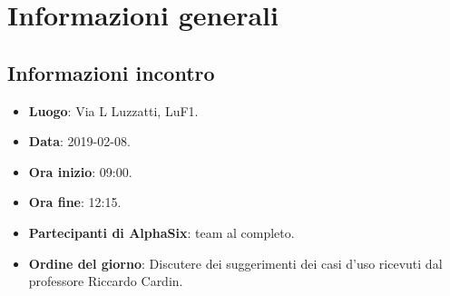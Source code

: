 \newcommand{\documento}{\VI}
\newcommand{\nomedocumentofisico}{VI\_2019-02-08.pdf}
\newcommand{\redazione}{\SG}
\newcommand{\verifica}{\LC}
\newcommand{\approvazione}{\TG}
\newcommand{\versione}{1.0.0}
\newcommand{\uso}{Interno}
\newcommand{\destinateTo}{\gruppo}
\newcommand{\datacreazione}{10 febbraio 2019}
\newcommand{\datamodifica}{12 febbraio 2019}
\newcommand{\stato}{Approvato}

\def\TABELLE{false}	%
\def\FIGURE{false} 	%






    

    	
    
    \section{Informazioni generali}
		\subsection{Informazioni incontro}
			\begin{itemize}
				\item \textbf{Luogo}: Via L Luzzatti, LuF1.
				\item \textbf{Data}: 2019-02-08.
				\item \textbf{Ora inizio}: 09:00.
				\item \textbf{Ora fine}: 12:15.
				\item \textbf{Partecipanti di AlphaSix}: team al completo.
				\item \textbf{Ordine del giorno}: Discutere dei suggerimenti dei casi d'uso ricevuti dal professore Riccardo Cardin.
			\end{itemize}

